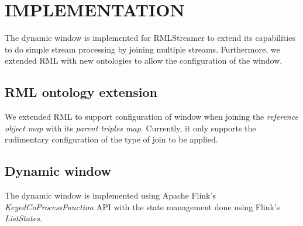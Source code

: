 \section{IMPLEMENTATION}%
\label{sec:Implementation}

The dynamic window is implemented for RMLStreamer 
to extend its capabilities to do simple stream processing by 
joining multiple streams.  Furthermore, we extended RML
with new ontologies to allow the configuration of the window. 

\subsection{RML ontology extension}
We extended RML to support configuration of window when
joining the \emph{reference object map} with its \emph{parent triples map}. 
Currently, it only supports the rudimentary 
configuration of the type of join to be applied.

\subsection{Dynamic window}
The dynamic window is implemented using Apache Flink's 
\emph{KeyedCoProcessFunction} API with the state management 
done using Flink's \emph{ListStates}.
